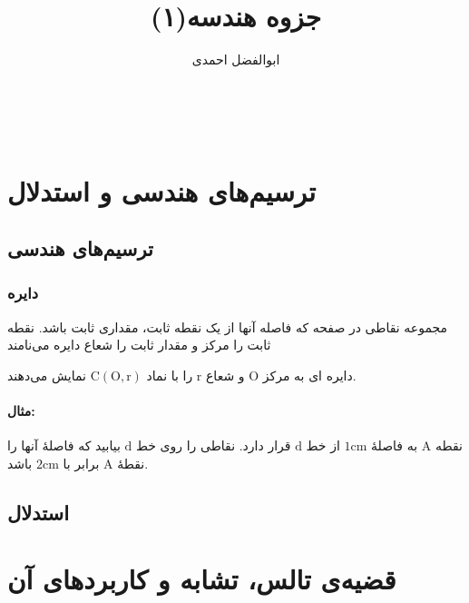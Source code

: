 \documentclass[12pt, a4paper]{book}
\title{جزوه هندسه(۱)}
\author{ابوالفضل احمدی}
\begin{document}
	‎
	‎
	‎
	‎
	‎
	‎
	‎
	‎
	‎
	
	\maketitle
	\setcounter{page}{1}
\chapter{ترسیم‌های هندسی و استدلال}

\section{ترسیم‌های هندسی}

\subsection{دایره}
مجموعه نقاطی در صفحه که فاصله آنها از یک نقطه ثابت، مقداری ثابت باشد. نقطه ثابت را مرکز و مقدار ثابت را شعاع دایره می‌نامند

دایره ای به مرکز
 $\mathrm{O}$
  و شعاع
   $\mathrm{r}$
    را با نماد
 $\mathrm{C}(\mathrm{O},\mathrm{r})$
  نمایش می‌دهند.

\subsubsection*{مثال:}
نقطه 
$\mathrm{A}$
به فاصلۀ
$\mathrm{1cm}$
از خط 
$\mathrm{d}$
قرار دارد. نقاطی را روی خط
$\mathrm{d}$
بیابید که فاصلۀ آنها را نقطۀ
$\mathrm{A}$
برابر با
$\mathrm{2cm}$
باشد.

\section{استدلال}

\chapter{قضیه‌ی تالس، تشابه و کاربردهای آن}
\end{document}
